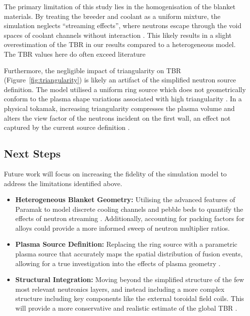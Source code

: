 \documentclass[12pt]{article}
\begin{document}
The primary limitation of this study lies in the homogenisation of the blanket materials. By
treating the breeder and coolant as a uniform mixture, the simulation neglects ``streaming
effects'', where neutrons escape through the void spaces of coolant channels without interaction
\cite{fradera_pre-conceptual_2021}. This likely results in a slight overestimation of the TBR in our
results compared to a heterogeneous model. The TBR values here do often exceed literature
\cite{meschini_modeling_2023,boullon_molten_2021,segantin_neutronic_2020,goel_optimisation_2023}

Furthermore, the negligible impact of triangularity on TBR (Figure~\ref{fig:triangularity}) is
likely an artifact of the simplified neutron source definition. The model utilised a uniform ring
source which does not geometrically conform to the plasma shape variations associated with high
triangularity \cite{shimwell_paramak_2021}. In a physical tokamak, increasing triangularity
compresses the plasma volume and alters the view factor of the neutrons incident on the first wall,
an effect not captured by the current source definition \cite{creely_overview_2020}.

\subsection{Next Steps}

Future work will focus on increasing the fidelity of the simulation model to address the limitations
identified above.
\begin{itemize}
    \item \textbf{Heterogeneous Blanket Geometry:} Utilising the advanced features of Paramak to
    model discrete cooling channels and pebble beds to quantify the effects of neutron streaming
    \cite{shimwell_paramak_2021}. Additionally, accounting for packing factors for
     alloys could provide a more informed sweep of neutron multiplier ratios.
    \item \textbf{Plasma Source Definition:} Replacing the ring source with a parametric plasma
    source that accurately maps the spatial distribution of fusion events, allowing for a true
    investigation into the effects of plasma geometry \cite{fable_plasma_2018}.
    \item \textbf{Structural Integration:} Moving beyond the simplified structure of the few most
    relevant neutronics layers, and instead including a more complex structure including key
    components like the external toroidal field coils. This will provide a more conservative and
    realistic estimate of the global TBR \cite{federici_overview_2019, lei_design_2020}.

\end{itemize}
\end{document}
